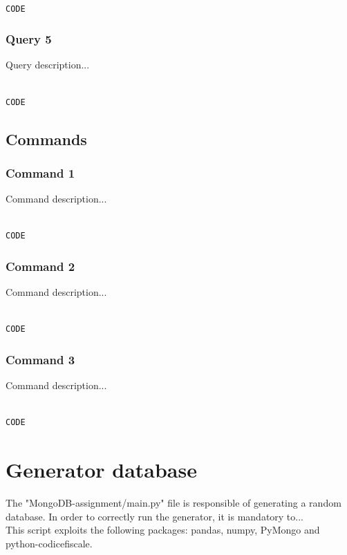 \documentclass{article}
\begin{document}
\begin{lstlisting}[language=cypher, label=lst:cypher-example]

CODE

\end{lstlisting}
\subsubsection{Query 5}
Query description...

\begin{lstlisting}[language=cypher, label=lst:cypher-example]

CODE

\end{lstlisting}
\newpage
\subsection{Commands}
\subsubsection{Command 1}
Command description...

\begin{lstlisting}[language=cypher, label=lst:cypher-example]

CODE

\end{lstlisting}
\subsubsection{Command 2}
Command description...

\begin{lstlisting}[language=cypher, label=lst:cypher-example]

CODE

\end{lstlisting}
\subsubsection{Command 3}
Command description...

\begin{lstlisting}[language=cypher, label=lst:cypher-example]

CODE

\end{lstlisting}
\newpage
\section{Generator database}
The {\selectfont"MongoDB-assignment/main.py"} file is responsible of generating a random database.
In order to correctly run the generator, it is mandatory to...
\\This script exploits the following packages: {\selectfont pandas, numpy, PyMongo and python-codicefiscale}.
\end{document}
